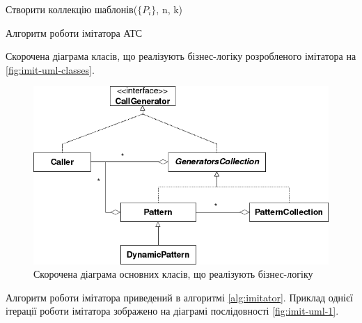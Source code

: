 \begin{algorithm}[h]
  Створити коллекцію шаблонів($\{P_i\}$, n, k)\;
\caption{Алгоритм роботи імітатора АТС}
\label{alg:imitator}
\end{algorithm}

Скорочена діаграма класів, що реалізують бізнес-логіку розробленого імітатора на \autoref{fig:imit-uml-classes}.

\begin{figure}[h]
        \begin{center}
            \includegraphics[scale=0.8]{resources/imit-uml-classes.png}
        \end{center}
        \caption{Скорочена діаграма основних класів, що реалізують бізнес-логіку}
        \label{fig:imit-uml-classes}
\end{figure}

Алгоритм роботи імітатора приведений в алгоритмі \ref{alg:imitator}. Приклад однієї ітерації роботи імітатора зображено на діаграмі послідовності \autoref{fig:imit-uml-1}.

